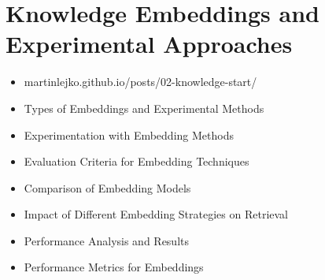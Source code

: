 \section{Knowledge Embeddings and Experimental Approaches}
\begin{itemize}
    \item martinlejko.github.io/posts/02-knowledge-start/
    \item Types of Embeddings and Experimental Methods
    \item Experimentation with Embedding Methods
    \item Evaluation Criteria for Embedding Techniques
    \item Comparison of Embedding Models
    \item Impact of Different Embedding Strategies on Retrieval
    \item Performance Analysis and Results
    \item Performance Metrics for Embeddings
\end{itemize}